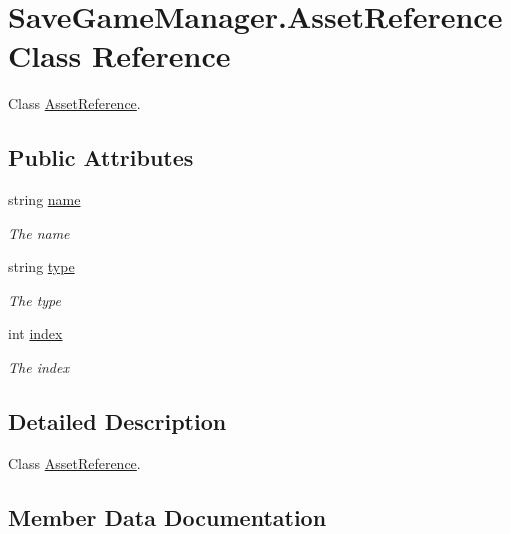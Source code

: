 \hypertarget{class_save_game_manager_1_1_asset_reference}{}\section{Save\+Game\+Manager.\+Asset\+Reference Class Reference}
\label{class_save_game_manager_1_1_asset_reference}


Class \hyperlink{class_save_game_manager_1_1_asset_reference}{Asset\+Reference}.  


\subsection*{Public Attributes}
\begin{DoxyCompactItemize}
\item 
string \hyperlink{class_save_game_manager_1_1_asset_reference_a79781c3cdd4d102af7416a7ba6e22f36}{name}
\begin{DoxyCompactList}\small\item\em The name \end{DoxyCompactList}\item 
string \hyperlink{class_save_game_manager_1_1_asset_reference_a8576431a922c1ac4d860c29f1742de96}{type}
\begin{DoxyCompactList}\small\item\em The type \end{DoxyCompactList}\item 
int \hyperlink{class_save_game_manager_1_1_asset_reference_a39b6f20c7e4958cdb0257538a9d608fb}{index}
\begin{DoxyCompactList}\small\item\em The index \end{DoxyCompactList}\end{DoxyCompactItemize}


\subsection{Detailed Description}
Class \hyperlink{class_save_game_manager_1_1_asset_reference}{Asset\+Reference}. 



\subsection{Member Data Documentation}
\mbox{\label{class_save_game_manager_1_1_asset_reference_a39b6f20c7e4958cdb0257538a9d608fb}} 
